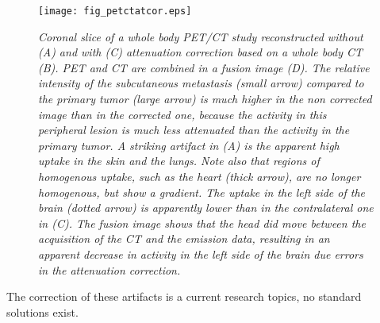 \begin{figure}[tbp]
\centering
\texttt{[image: fig\_petctatcor.eps]}
\caption{\label{fig:petctatcor} \emph{Coronal slice of a whole body
PET/CT study reconstructed without (A) and with (C) attenuation
correction based on a whole body CT (B). PET and CT are combined in a
fusion image (D). The relative intensity of the subcutaneous
metastasis (small arrow) compared to the primary tumor (large arrow)
is much higher in the non corrected image than in the corrected one,
because the activity in this peripheral lesion is much less attenuated
than the activity in the primary tumor. A striking artifact in (A) is
the apparent high uptake in the skin and the lungs. Note also that
regions of homogenous uptake, such as the heart (thick arrow), are no
longer homogenous, but show a gradient. The uptake in the left side of
the brain (dotted arrow) is apparently lower than in the contralateral
one in (C). The fusion image shows that the head did move between the
acquisition of the CT and the emission data, resulting in an apparent
decrease in activity in the left side of the brain due errors in the
attenuation correction.}}
\end{figure}

The correction of these artifacts is a current research topics, no standard
solutions exist.